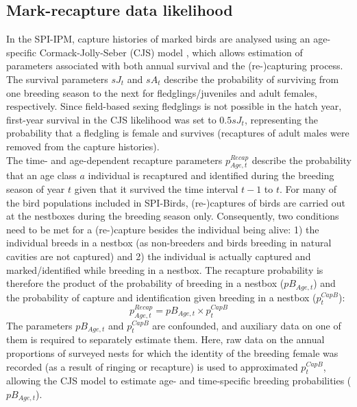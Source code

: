 \documentclass[
]{book}
\begin{document}
\hypertarget{mark-recapture-data-likelihood}{%
\subsection{Mark-recapture data likelihood}\label{mark-recapture-data-likelihood}}

In the SPI-IPM, capture histories of marked birds are analysed using an age-specific Cormack-Jolly-Seber (CJS) model \citep{cormack1964, jolly1965, seber1965}, which allows estimation of parameters associated with both annual survival and the (re-)capturing process.\\
The survival parameters \(sJ_t\) and \(sA_t\) describe the probability of surviving from one breeding season to the next for fledglings/juveniles and adult females, respectively. Since field-based sexing fledglings is not possible in the hatch year, first-year survival in the CJS likelihood was set to \(0.5sJ_t\), representing the probability that a fledgling is female and survives (recaptures of adult males were removed from the capture histories).\\
The time- and age-dependent recapture parameters \(p_{Age,t}^{Recap}\) describe the probability that an age class \(a\) individual is recaptured and identified during the breeding season of year \(t\) given that it survived the time interval \(t-1\) to \(t\). For many of the bird populations included in SPI-Birds, (re-)captures of birds are carried out at the nestboxes during the breeding season only. Consequently, two conditions need to be met for a (re-)capture besides the individual being alive: 1) the individual breeds in a nestbox (as non-breeders and birds breeding in natural cavities are not captured) and 2) the individual is actually captured and marked/identified while breeding in a nestbox. The recapture probability is therefore the product of the probability of breeding in a nestbox (\(pB_{Age,t}\)) and the probability of capture and identification given breeding in a nestbox (\(p_t^{CapB}\)):
\begin{equation}
  p_{Age,t}^{Recap}=pB_{Age,t}\times p_t^{CapB}
\end{equation}
The parameters \(pB_{Age,t}\) and \(p_t^{CapB}\) are confounded, and auxiliary data on one of them is required to separately estimate them. Here, raw data on the annual proportions of surveyed nests for which the identity of the breeding female was recorded (as a result of ringing or recapture) is used to approximated \(p_t^{CapB}\), allowing the CJS model to estimate age- and time-specific breeding probabilities (\(pB_{Age,t}\)).\\
\end{document}
